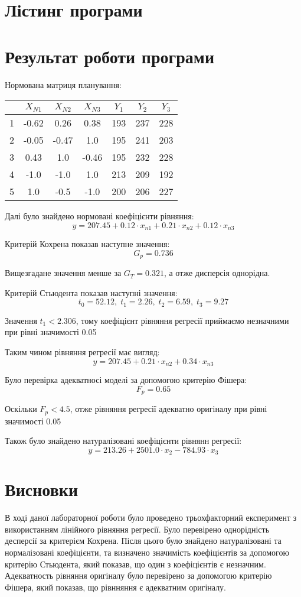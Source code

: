 \section{Лістинг програми}



\newpage

\section{Результат роботи програми}

Нормована матриця планування:
\begin{center}
    \begin{tabular}{|c|c|c|c|c|c|c|}
        \hline
         & $X_{N1}$ & $X_{N2}$ & $X_{N3}$ & $Y_{1}$ & $Y_{2}$ & $Y_{3}$ \\ 
        \hline
        1& -0.62 & 0.26 & 0.38 & 193 & 237 & 228\\
        2& -0.05 & -0.47 & 1.0 & 195 & 241 & 203\\
        3& 0.43 & 1.0 & -0.46 & 195 & 232 & 228\\
        4& -1.0 & -1.0 & 1.0 & 213 & 209 & 192\\
        5& 1.0 & -0.5 & -1.0 & 200 & 206 & 227\\
        \hline
    \end{tabular}
\end{center}

Далі було знайдено нормовані коефіцієнти рівняння:
\[y = 207.45+0.12\cdot x_{n1}+0.21\cdot x_{n2}+0.12\cdot x_{n3}\]

Критерій Кохрена показав наступне значення:
\[G_p = 0.736\]

Вищезгадане значення менше за $G_T=0.321$, а отже дисперсія однорідна.

Критерій Стьюдента показав наступні значення:
\[t_0=52.12,\; t_1=2.26,\; t_2=6.59,\; t_3=9.27\]

Значення $t_1<2.306$, тому коефіцієнт рівняння регресії приймаємо
незначними при рівні значимості 0.05

Таким чином рівняння регресії має вигляд:
\[y = 207.45+0.21\cdot x_{n2}+0.34\cdot x_{n3}\]

Було перевірка адекватносі моделі за допомогою критерію Фішера:
\[F_p = 0.65\]

Оскільки $F_p<4.5$, отже рівняння регресії адекватно оригіналу при рівні 
значимості 0.05

Також було знайдено натуралізовані коефіцієнти рівнянн регресії:
\[y = 213.26+2501.0\cdot x_{2}-784.93\cdot x_{3}\]

\section{Висновки}
В ході даної лабораторної роботи було проведено трьохфакторний експеримент з 
використанням лінійного рівняння регресії. Було перевірено однорідність десперсії
за критерієм Кохрена. Після цього було знайдено натуралізовані та нормалізовані коефіцієнти, та визначено
значимість коефіцієнтів за допомогою критерію Стьюдента, який показав, що один з 
коефіцієнтів є незначним. Адекватность рівняння оригіналу було перевірено за допомогою
критерію Фішера, який показав, що рівнняння є адекватним оригіналу.
